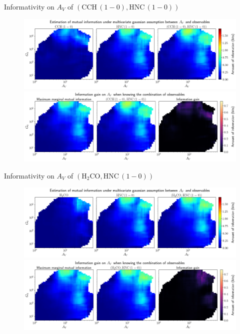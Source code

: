 \documentclass{beamer}
\begin{document}
\begin{frame}{Informativity on $A_V$ of $\left(\mathrm{CCH\,(1-0)},\mathrm{HNC\,(1-0)}\right)$}
    \begin{figure}
        \centering
        \includegraphics[width=0.95\linewidth]{../linearinfogauss/av__cch10_hnc10_linearinfogauss.png}
        \vfill
        \includegraphics[width=0.95\linewidth]{../linearinfogauss/av__cch10_hnc10_linearinfogauss_gain.png}
    \end{figure}
\end{frame}

\begin{frame}{Informativity on $A_V$ of $\left(\mathrm{H_2CO},\mathrm{HNC\,(1-0)}\right)$}
    \begin{figure}
        \centering
        \includegraphics[width=0.95\linewidth]{../linearinfogauss/av__h2co_hnc10_linearinfogauss.png}
        \vfill
        \includegraphics[width=0.95\linewidth]{../linearinfogauss/av__h2co_hnc10_linearinfogauss_gain.png}
    \end{figure}
\end{frame}
\end{document}
